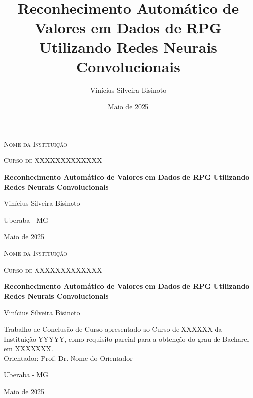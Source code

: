 \documentclass[12pt]{article}
\title{Reconhecimento Automático de Valores em Dados de RPG Utilizando Redes Neurais Convolucionais}
\author{Vinícius Silveira Bisinoto}
\date{Maio de 2025}
\begin{document}
\begin{titlepage}
    \centering
    {\scshape\Large Nome da Instituição \par}
    \vspace{1.5cm}
    {\scshape\Large Curso de XXXXXXXXXXXXX \par}
    \vfill
    {\bfseries\Large Reconhecimento Automático de Valores em Dados de RPG Utilizando Redes Neurais Convolucionais\par}
    \vspace{1cm}
    {\Large Vinícius Silveira Bisinoto\par}
    \vfill
    {\large Uberaba - MG\par}
    {\large Maio de 2025\par}
\end{titlepage}

\begin{titlepage}
    \centering
    {\scshape\Large Nome da Instituição \par}
    \vspace{1.5cm}
    {\scshape\Large Curso de XXXXXXXXXXXXX \par}
    \vfill
    {\bfseries\Large Reconhecimento Automático de Valores em Dados de RPG Utilizando Redes Neurais Convolucionais\par}
    \vspace{1cm}
    {\Large Vinícius Silveira Bisinoto\par}
    \vspace{2cm}
    \begin{flushright}
        Trabalho de Conclusão de Curso apresentado ao Curso de XXXXXX da Instituição YYYYY, como requisito parcial para a obtenção do grau de Bacharel em XXXXXXX.\\
        \vspace{0.5cm}
        Orientador: Prof. Dr. Nome do Orientador
    \end{flushright}
    \vfill
    {\large Uberaba - MG\par}
    {\large Maio de 2025\par}
\end{titlepage}

\tableofcontents
\newpage








\end{document}
